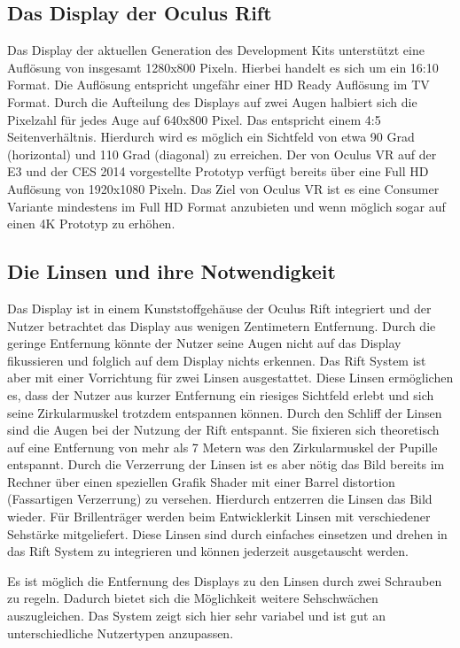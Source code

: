\documentclass[pagesize, paper=a4, fontsize=12pt,titlepage=true, headings=small, headnosepline, abstractoff, liststotoc, nochapterprefix, plainheadsepline]{scrreprt}
\begin{document}
\subsection{Das Display der Oculus Rift}
Das Display der aktuellen Generation des Development Kits unterstützt eine Auflösung von insgesamt 1280x800 Pixeln. Hierbei handelt es sich um ein 16:10 Format. Die Auflösung entspricht ungefähr einer HD Ready Auflösung im TV Format. Durch die Aufteilung des Displays auf zwei Augen halbiert sich die Pixelzahl für jedes Auge auf 640x800 Pixel. Das entspricht einem 4:5 Seitenverhältnis. Hierdurch wird es möglich ein Sichtfeld von etwa 90 Grad (horizontal) und 110 Grad (diagonal) zu erreichen. Der von Oculus VR auf der E3 und der CES 2014 vorgestellte Prototyp verfügt bereits über eine Full HD Auflösung von 1920x1080 Pixeln. Das Ziel von Oculus VR ist es eine Consumer Variante mindestens im Full HD Format anzubieten und wenn möglich sogar auf einen 4K Prototyp zu erhöhen.

\subsection{Die Linsen und ihre Notwendigkeit}
Das Display ist in einem Kunststoffgehäuse der Oculus Rift integriert und der Nutzer betrachtet das Display aus wenigen Zentimetern Entfernung. Durch die geringe Entfernung könnte der Nutzer seine Augen nicht auf das Display fikussieren und folglich auf dem Display nichts erkennen. Das Rift System ist aber mit einer Vorrichtung für zwei Linsen ausgestattet. Diese Linsen ermöglichen es, dass der Nutzer aus kurzer Entfernung ein riesiges Sichtfeld erlebt und sich seine Zirkularmuskel trotzdem entspannen können. Durch den Schliff der Linsen sind die Augen bei der Nutzung der Rift entspannt. Sie fixieren sich theoretisch auf eine Entfernung von mehr als 7 Metern was den Zirkularmuskel der Pupille entspannt. Durch die Verzerrung der Linsen ist es aber nötig das Bild bereits im Rechner über einen speziellen Grafik Shader mit einer Barrel distortion (Fassartigen Verzerrung) zu versehen. Hierdurch entzerren die Linsen das Bild wieder. Für Brillenträger werden beim Entwicklerkit Linsen mit verschiedener Sehstärke mitgeliefert. Diese Linsen sind durch einfaches einsetzen und drehen in das Rift System zu integrieren und können jederzeit ausgetauscht werden.

Es ist möglich die Entfernung des Displays zu den Linsen durch zwei Schrauben zu regeln. Dadurch bietet sich die Möglichkeit weitere Sehschwächen auszugleichen. Das System zeigt sich hier sehr variabel und ist gut an unterschiedliche Nutzertypen anzupassen.
\end{document}
